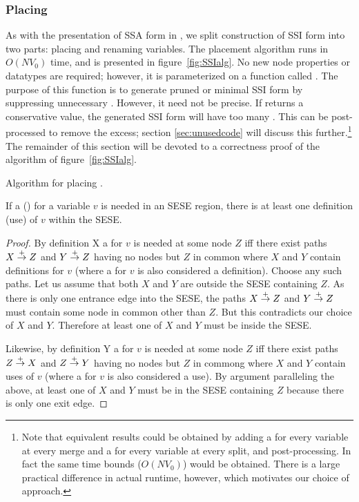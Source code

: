\documentclass[12pt,titlepage,twoside]{article}
\begin{document}
\subsubsection{Placing }
As with the presentation of SSA form in \cite{cytron91:ssa}, we split
construction of SSI form into two parts: placing 
and renaming variables.  The placement algorithm runs in $O(N V_0)$
time, and is presented in figure~\vref{fig:SSIalg}.  No new node
properties or datatypes are required; however, it is parameterized on
a function called .  The purpose of this function is
to generate pruned or minimal SSI form by suppressing unnecessary
.  However, it need not be precise.  If
 returns a conservative value, the generated SSI
form will have too many .  This can be
post-processed to remove the excess; section \ref{sec:unusedcode} will
discuss this further.\footnote{Note that equivalent results could be
obtained by adding a \phifunction{} for every variable at every merge
and a \sigfunction{} for every variable at every split, and
post-processing.  In fact the same time bounds ($O(N V_0)$) would be
obtained.  There is a large practical difference in actual runtime,
however, which motivates our choice of approach.}  The remainder of
this section will be devoted to a correctness proof of the algorithm
of figure~\ref{fig:SSIalg}.

\begin{myfigure}\small%

\caption{Algorithm for placing .}\label{fig:SSIalg}
\end{myfigure}

\begin{lemma}
If a \phifunction{} (\sigfunction{}) for a variable $v$ is needed in
an SESE region, there is at least one definition (use) of $v$ within
the SESE.
\end{lemma}
\begin{proof}
By definition X a \phifunction{} for $v$ is needed at some node $Z$
iff there exist paths $X \stackrel{+}{\rightarrow} Z$ and $Y \stackrel{+}{\rightarrow} Z$ having no
nodes but $Z$ in common where $X$ and $Y$ contain definitions for $v$
(where a \phisigfunction[or] for $v$ is also considered a definition).
Choose any such paths.  Let us assume that both $X$ and $Y$ are
outside the SESE containing $Z$.  As there is only one entrance edge
into the SESE, the paths $X \stackrel{+}{\rightarrow} Z$ and $Y \stackrel{+}{\rightarrow} Z$ must
contain some node in common other than $Z$.  But this contradicts our
choice of $X$ and $Y$.  Therefore at least one of $X$ and $Y$ must be
inside the SESE.

Likewise, by definition Y a \sigfunction{} for $v$ is needed at some
node $Z$ iff there exist paths $Z \stackrel{+}{\rightarrow} X$ and $Z \stackrel{+}{\rightarrow} Y$
having no nodes but $Z$ in commong where $X$ and $Y$ contain uses of
$v$ (where a \phisigfunction[or] for $v$ is also considered a use).
By argument paralleling the above, at least one of $X$ and $Y$ must be
in the SESE containing $Z$ because there is only one exit edge.
\end{proof}
\end{document}
